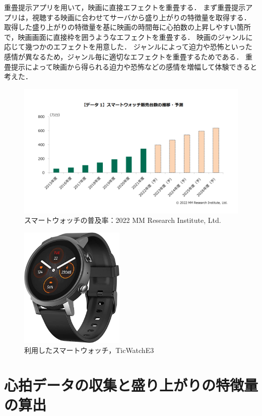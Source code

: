 重畳提示アプリを用いて，映画に直接エフェクトを重畳する．
まず重畳提示アプリは，視聴する映画に合わせてサーバから盛り上がりの特徴量を取得する．
取得した盛り上がりの特徴量を基に映画の時間毎に心拍数の上昇しやすい箇所で，映画画面に直接枠を囲うようなエフェクトを重畳する．
映画のジャンルに応じて幾つかのエフェクトを用意した．
ジャンルによって迫力や恐怖といった感情が異なるため，ジャンル毎に適切なエフェクトを重畳するためである．
重畳提示によって映画から得られる迫力や恐怖などの感情を増幅して体験できると考えた．


\begin{figure}[H]
    \centering
    \includegraphics[width=14cm]{images/chapter3/watchreserch.png}
    \caption{スマートウォッチの普及率：2022 MM Research Institute, Ltd.}
    \label{watchfukyuu}
\end{figure}

\begin{figure}[H]
    \centering
    \includegraphics[width=5cm]{images/chapter3/watch.jpg}
    \caption{利用したスマートウォッチ，TicWatchE3}
    \label{watche3}
\end{figure}


\section{心拍データの収集と盛り上がりの特徴量の算出}

